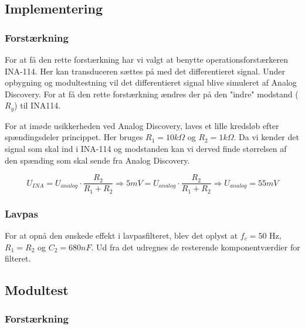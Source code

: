 \subsection{Implementering}
\subsubsection{Forstærkning}
For at få den rette forstærkning har vi valgt at benytte operationsforstærkeren INA-114. Her kan transduceren sættes på med det differentieret signal. Under opbygning og modultestning vil det differentieret signal blive simuleret af Analog Discovery.
For at få den rette forstærkning ændres der på den "indre" modstand ($ R_g $) til INA114.
 
For at imøde usikkerheden ved Analog Discovery, laves et lille kredsløb efter spændingsdeler princippet. Her bruges $ R_1=10k\Omega $ og $ R_2 = 1k\Omega $. Da vi kender det signal som skal ind i INA-114 og modstanden kan vi derved finde størrelsen af den spænding som skal sende fra Analog Discovery.
 
\begin{equation}
U_{INA} = U_{analog} \cdot \frac{R_2}{R_1 + R_2} \Rightarrow 5mV = U_{analog}\cdot \frac{R_2}{R_1+R_2} \Rightarrow U_{analog}= 55mV
\end{equation} 

\subsubsection{Lavpas}
For at opnå den ønskede effekt i lavpasfilteret, blev det oplyst at $ f_c=50$ Hz, $ R_1 = R_2 $ og $ C_2=680 nF$. Ud fra det udregnes de resterende komponentværdier for filteret.  


\subsection{Modultest}
\subsubsection{Forstærkning}
